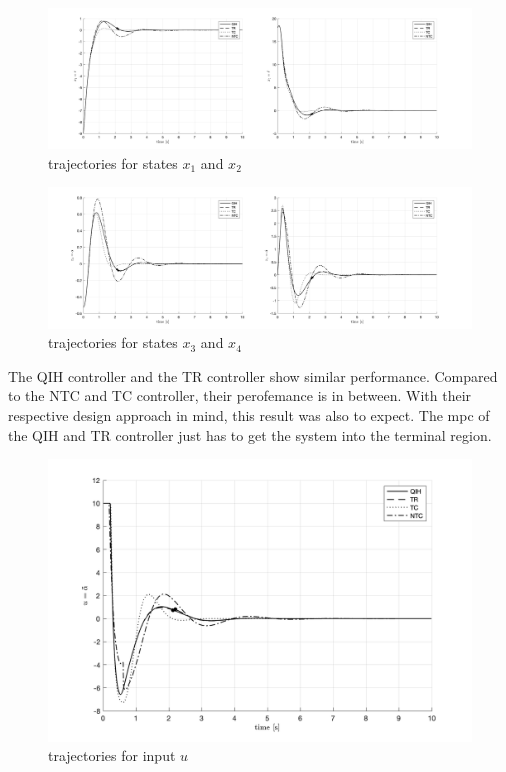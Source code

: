 \documentclass[10pt,a4paper]{article}
\begin{document}
\begin{figure}[h]
	\begin{center}
		\includegraphics[width=\textwidth]{img/bb_time_x1x2.png}
		\caption{trajectories for states $x_1$ and $x_2$}
		\label{pic:bb_time_x1x2}
	\end{center}
\end{figure}

\begin{figure}[h]
	\begin{center}
		\includegraphics[width=\textwidth]{img/bb_time_x3x4.png}
		\caption{trajectories for states $x_3$ and $x_4$}
		\label{pic:bb_time_x3x4}
	\end{center}
\end{figure}

The QIH controller and the TR controller show similar performance. Compared to the NTC and TC controller, their perofemance is in between. With their respective 
design approach in mind, this result was also to expect. The \gls{mpc} of the QIH and TR controller just has to get the system into the terminal region.

\begin{figure}[h]
	\begin{center}
		\includegraphics[width=\textwidth]{img/bb_time_u.png}
		\caption{trajectories for input $u$}
		\label{pic:bb_time_u}
	\end{center}
\end{figure}
\end{document}
